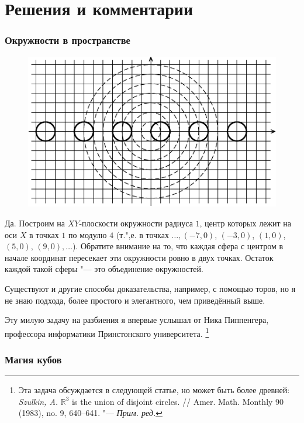 \documentclass[twoside]{book}
\begin{document}

\section*{Решения и комментарии}

\subsubsection*{Окружности в пространстве}%

\begin{figure}[b]
  \vspace{-\jot}
\centering
\includegraphics {mp/wink-10}
\end{figure} 

Да.
Построим на $XY$-плоскости окружности радиуса $1$, центр которых лежит на оси $X$ в точках $1$ по модулю $4$ (т.",е. в точках $\dots, (-7,0)$, $(-3,0)$, $(1,0)$, $(5,0)$, $(9,0),\dots$).
Обратите внимание на то, что каждая сфера с центром в начале координат пересекает эти окружности ровно в двух точках.
Остаток каждой такой сферы "--- это объединение окружностей.
\heart


Существуют и другие способы доказательства, например, с помощью торов, но я не знаю подхода, более простого и элегантного, чем приведённый выше.

Эту милую задачу на разбиения я впервые услышал от Ника Пиппенгера, %
профессора информатики Принстонского университета.
\footnote{Эта задача обсуждается в следующей статье, но может быть более древней: 
\emph{Szulkin, A.} $\mathbb{R}^3$ is the union of disjoint circles. /\!/ Amer. Math. Monthly 90 (1983), no. 9, 640--641. "--- \emph{Прим. ред.}}

\subsubsection*{Магия кубов}%
\end{document}
